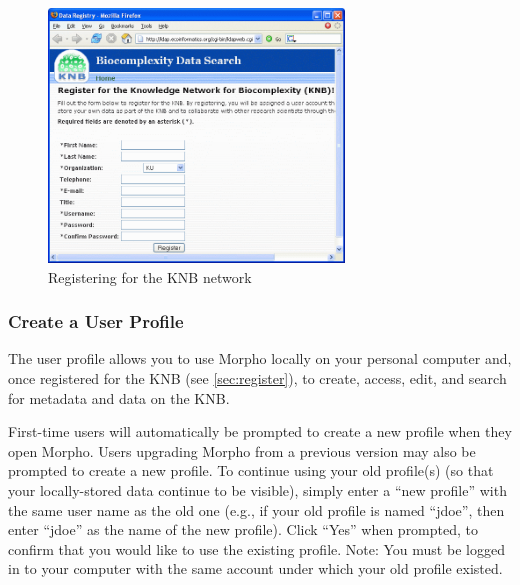 \begin{figure}
  \centering
    \includegraphics[width=0.7\textwidth]{images/register-knb.png}
  \caption{Registering for the KNB network}
  \label{fig:register-knb}
\end{figure}

\subsubsection{Create a User Profile}

The user profile allows you to use Morpho locally on your personal
computer and, once registered for the KNB (see \ref{sec:register}), to
create, access, edit, and search for metadata and data on the KNB. 

First-time users will automatically be prompted to create a new profile
when they open Morpho. Users upgrading Morpho from a previous version
may also be prompted to create a new profile. To continue using your
old profile(s) (so that your locally-stored data continue to be
visible), simply enter a ``new profile'' with the same user name as the
old one (e.g., if your old profile is named ``jdoe'', then enter
``jdoe'' as the name of the new profile). Click ``Yes'' when prompted,
to confirm that you would like to use the existing profile. Note: You
must be logged in to your computer with the same account under which
your old profile existed.

